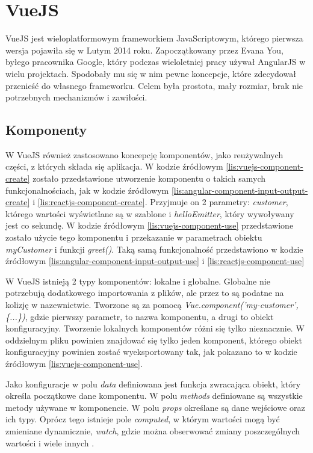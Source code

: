 \section{VueJS}
	VueJS jest wieloplatformowym frameworkiem JavaScriptowym, którego pierwsza wersja pojawiła się w Lutym 2014 roku. Zapoczątkowany przez Evana You, byłego pracownika Google, który podczas wieloletniej pracy używał AngularJS w wielu projektach. Spodobały mu się w nim pewne koncepcje, które zdecydował przenieść do własnego frameworku. Celem była prostota, mały rozmiar, brak nie potrzebnych mechanizmów i zawiłości.

	\subsection{Komponenty}
	W VueJS również zastosowano koncepcję komponentów, jako reużywalnych części, z których składa się aplikacja. W kodzie źródłowym \ref{lis:vuejs-component-create} zostało przedstawione utworzenie komponentu o takich samych funkcjonalnościach, jak w kodzie źródłowym \ref{lis:angular-component-input-output-create} i \ref{lis:reactjs-component-create}. Przyjmuje on 2 parametry: \textit{customer}, którego wartości wyświetlane są w szablone i \textit{helloEmitter}, który wywoływany jest co sekundę. W kodzie źródłowym \ref{lis:vuejs-component-use} przedstawione zostało użycie tego komponentu i przekazanie w parametrach obiektu \textit{myCustomer} i funkcji \textit{greet()}. Taką samą funkcjonalność przedstawiono w kodzie źródłowym \ref{lis:angular-component-input-output-use} i \ref{lis:reactjs-component-use}\par
	W VueJS istnieją 2 typy komponentów: lokalne i globalne. Globalne nie potrzebują dodatkowego importowania z plików, ale przez to są podatne na kolizję w nazewnictwie. Tworzone są za pomocą \textit{Vue.component('my-customer',\{...\})}, gdzie pierwszy parametr, to nazwa komponentu, a drugi to obiekt konfiguracyjny. Tworzenie lokalnych komponentów różni się tylko nieznacznie. W oddzielnym pliku powinien znajdować się tylko jeden komponent, którego obiekt konfiguracyjny powinien zostać wyeksportowany tak, jak pokazano to w kodzie źródłowym \ref{lis:vuejs-component-use}.\par
	Jako konfiguracje w polu \textit{data} definiowana jest funkcja zwracająca obiekt, który określa początkowe dane komponentu. W polu \textit{methods} definiowane są wszystkie metody używane w komponencie. W polu \textit{props} określane są dane wejściowe oraz ich typy. Oprócz tego istnieje pole \textit{computed}, w którym wartości mogą być zmieniane dynamicznie, \textit{watch}, gdzie można obserwować zmiany poszczególnych wartości i wiele innych \cite{vuejs-api}.
	
